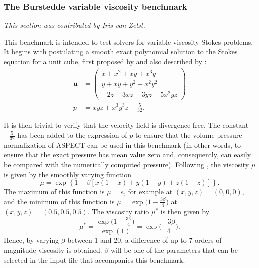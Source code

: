 \documentclass{article}
\newcommand{\aspect}{\textsc{ASPECT}}
\begin{document}






\subsubsection{The Burstedde variable viscosity benchmark}
\label{sec:benchmark-burstedde}

\textit{This section was contributed by Iris van Zelst.}

This benchmark is intended to test solvers for variable viscosity Stokes
problems. It begins with postulating a smooth exact polynomial solution to the Stokes equation for a unit cube, first proposed by \cite{dobo04} and also described by \cite{busa13}:
\begin{align}
  {\mathbf u} &= \left( \begin{array}{c}
      x+x^2+xy+x^3y \\
      y + xy + y^2 + x^2 y^2\\
      -2z - 3xz - 3yz - 5x^2 yz
    \end{array}
  \right)
  \label{eq:burstedde-velocity}
  \\
  p &= xyz + x^3 y^3z - \frac{5}{32}.
  \label{eq:burstedde-pressure}
\end{align}

It is then trivial to verify that the velocity field is divergence-free. The
constant $-\frac{5}{32}$ has been added to the expression of $p$ to ensure
that the volume pressure normalization of \aspect{} can be used in this
benchmark (in other words, to ensure that the exact pressure has mean value
zero and, consequently, can easily be compared with the numerically computed
pressure). Following \cite{busa13}, the viscosity $\mu$ is given by the smoothly varying function
\begin{equation}
  \mu = \exp\left\{1 - \beta\left[x (1-x) + y(1-y) + z(1-z)\right]\right\}.
  \label{eq:burstedde-mu}
\end{equation}
The maximum of this function is $\mu = e$, for example at $(x,y,z)=(0,0,0)$, and the minimum of this function is $\mu = \exp \Big( 1-\frac{3\beta}{4}\Big)$ at $(x,y,z) = (0.5,0.5,0.5)$. The viscosity ratio $\mu^\ast$ is then given by
\begin{equation}
  \mu^\ast = \frac{\exp\Big(1-\frac{3\beta}{4}\Big)}{\exp(1)} = \exp\Big(\frac{-3\beta}{4}\Big).
\end{equation}
Hence, by varying $\beta$ between 1 and 20, a difference of up to 7 orders of
magnitude viscosity is obtained. $\beta$ will be one of the parameters that
can be selected in the input file that accompanies this benchmark.
\end{document}
